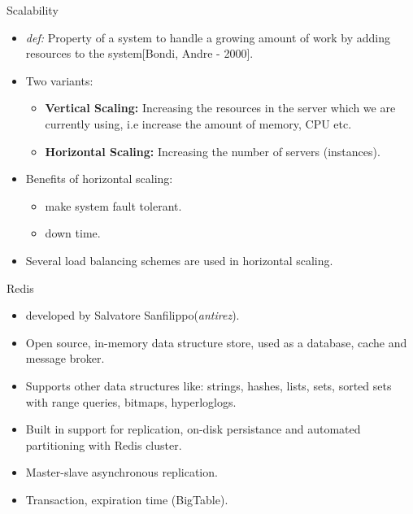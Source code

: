 \documentclass{beamer}
\begin{document}
\begin{frame}{Scalability}
    \begin{itemize}
        \item \textit{def:} Property of a system to handle a growing amount of work by adding resources
            to the system[Bondi, Andre - 2000].
        \item Two variants:
            \begin{itemize}
                \item \textbf{Vertical Scaling:} Increasing the resources in the
                        server which we are currently using, i.e increase the amount of memory, CPU etc.
                \item \textbf{Horizontal Scaling:} Increasing the number of servers (instances).
            \end{itemize}
        \item Benefits of horizontal scaling:
            \begin{itemize}
                \item make system fault tolerant.
                \item down time.
            \end{itemize}
        \item Several load balancing schemes are used in horizontal scaling.
    \end{itemize}
\end{frame}

\begin{frame}{Redis}
    \begin{itemize}
        \item developed by Salvatore Sanfilippo(\textit{antirez}).
        \item Open source, in-memory data structure store, used as a database, cache and message broker.
        \item Supports other data structures like: strings, hashes, lists, sets, sorted sets with range queries, bitmaps, hyperloglogs.
        \item Built in support for replication, on-disk persistance and automated partitioning with Redis cluster.
        \item Master-slave asynchronous replication.
        \item Transaction, expiration time (BigTable).
    \end{itemize}
\end{frame}
\end{document}
